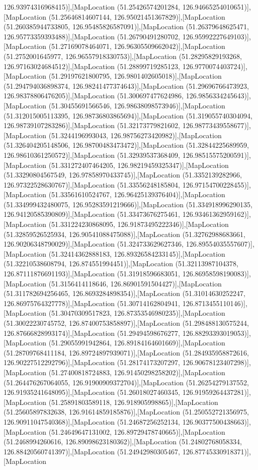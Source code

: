 126.93974316968415)],[MapLocation (51.25426574201284, 126.94665254010651)],[MapLocation (51.25646814607144, 126.95021451367829)],[MapLocation (51.260385944733805, 126.95485826587091)],[MapLocation (51.26379648625471, 126.95773359393488)],[MapLocation (51.26790491280702, 126.95992227649103)],[MapLocation (51.27169078464071, 126.96305509662042)],[MapLocation (51.2752001645977, 126.96557918330753)],[MapLocation (51.28295829193268, 126.97163024684512)],[MapLocation (51.28899719285123, 126.9770074403724)],[MapLocation (51.29197621800795, 126.9801402605018)],[MapLocation (51.294794036898374, 126.98241477374643)],[MapLocation (51.29696766473923, 126.98378806476205)],[MapLocation (51.300697477624986, 126.9856334245643)],[MapLocation (51.30455691566546, 126.98638098573946)],[MapLocation (51.312015005113395, 126.98736803865694)],[MapLocation (51.319055740304094, 126.98739107283286)],[MapLocation (51.32173779821602, 126.98773439558677)],[MapLocation (51.3244196993043, 126.98756273420982)],[MapLocation (51.326404205148506, 126.98700483473472)],[MapLocation (51.32844225689959, 126.98610361250572)],[MapLocation (51.32939537368409, 126.98515575200591)],[MapLocation (51.331272407464205, 126.98219459325347)],[MapLocation (51.33290804567549, 126.97858970433745)],[MapLocation (51.3352139282966, 126.97322528630767)],[MapLocation (51.33556248185804, 126.97154700228455)],[MapLocation (51.33561610524767, 126.96425139376404)],[MapLocation (51.334999432480075, 126.95283591219666)],[MapLocation (51.334918996290135, 126.94120585390809)],[MapLocation (51.33473676275461, 126.93461362959162)],[MapLocation (51.331224230868095, 126.91873495222346)],[MapLocation (51.32859526525934, 126.90541088475088)],[MapLocation (51.32762988683661, 126.90206348790029)],[MapLocation (51.324733629627346, 126.89554035557607)],[MapLocation (51.32414362888183, 126.89326584233145)],[MapLocation (51.32210538608794, 126.874551994451)],[MapLocation (51.32113987104378, 126.87111876691193)],[MapLocation (51.31918596683051, 126.86958598190083)],[MapLocation (51.3156414118646, 126.86901591504427)],[MapLocation (51.311782694256465, 126.8693284898354)],[MapLocation (51.31014630252247, 126.86975764327778)],[MapLocation (51.30714162804941, 126.8713455110146)],[MapLocation (51.30470309517823, 126.87353546980235)],[MapLocation (51.30022230745752, 126.87400753858897)],[MapLocation (51.298488130575244, 126.87666828993174)],[MapLocation (51.29494598676277, 126.88293393019053)],[MapLocation (51.29055991942864, 126.89184164601669)],[MapLocation (51.28709768411184, 126.89724897939071)],[MapLocation (51.284935958872616, 126.90227512292796)],[MapLocation (51.28174173207297, 126.90678123407298)],[MapLocation (51.27400818724883, 126.91450298258202)],[MapLocation (51.264476267064055, 126.91900909372704)],[MapLocation (51.26254279137552, 126.91935241648095)],[MapLocation (51.26018027460345, 126.91959264437281)],[MapLocation (51.25891803589118, 126.918905998865)],[MapLocation (51.25605897832638, 126.91614859185876)],[MapLocation (51.250552721356975, 126.90911047540368)],[MapLocation (51.24687256252134, 126.90377500438663)],[MapLocation (51.24649647131002, 126.89729478740665)],[MapLocation (51.2468994260616, 126.89098623180362)],[MapLocation (51.24802768058334, 126.88420560741397)],[MapLocation (51.24942980305467, 126.87745330918371)],[MapLocation 